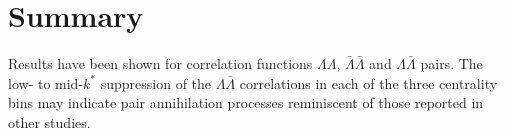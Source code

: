 \section{Summary}
Results have been shown for correlation functions $\Lambda\Lambda$, $\bar{\Lambda}\bar{\Lambda}$ and $\Lambda\bar{\Lambda}$ pairs.  
The low- to mid-$k^*$ suppression of the $\Lambda\bar{\Lambda}$ correlations in each of the three centrality bins may indicate pair annihilation processes reminiscent of those reported in other studies.


